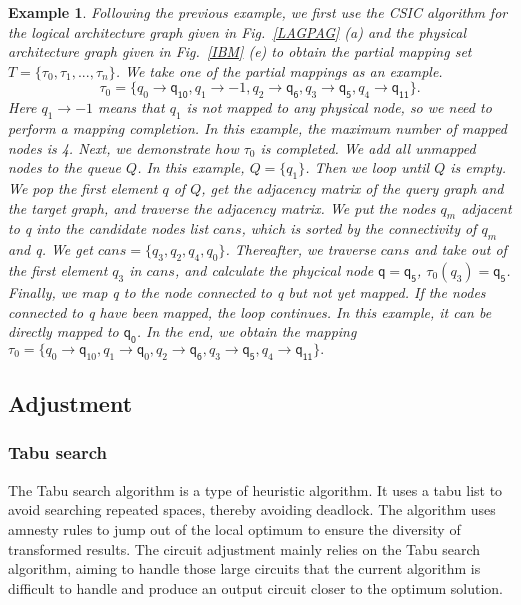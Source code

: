 \documentclass[journal]{IEEEtran}
\newtheorem{example}{Example}[section]
\begin{document}
\begin{example}
	Following the previous example, we first use the CSIC algorithm for the logical architecture graph given in Fig.~\ref{LAGPAG} (a) and the physical architecture graph given in Fig.~\ref{IBM} (e) to obtain the partial mapping set $T=\{\tau_{0},\tau_{1},...,\tau_{n}\}$. We take one of the partial mappings as an example.
	$$\tau_{0}=\{\textit{q}_\textit{0}\rightarrow \textsf{q}_{\textsf{10}},\textit{q}_\textit{1}\rightarrow -1,
	\textit{q}_\textit{2}\rightarrow \textsf{q}_{\textsf{6}},\textit{q}_\textit{3}\rightarrow \textsf{q}_{\textsf{5}},\textit{q}_\textit{4}\rightarrow \textsf{q}_{\textsf{11}}\}. $$ 
Here $\textit{q}_\textit{1}\rightarrow -1$ means that $\textit{q}_\textit{1}$ is not mapped to any physical node, so we need to perform a mapping completion. In this example, the maximum number of mapped nodes is 4. Next, we demonstrate how $\tau_{0}$ is completed. We add all unmapped nodes to the queue $Q$. In this example, $Q=\{\textit{q}_\textit{1}\}$. Then we loop until $Q$ is empty. We pop the first element $q$ of $Q$, get the adjacency matrix of the query graph and the target graph, and traverse the adjacency matrix. We put the nodes  $\textit{q}_\textit{m}$ adjacent to \textit{q} into the candidate nodes list $cans$, which is sorted by the connectivity of $\textit{q}_\textit{m}$ and \textit{q}. We get $cans=\{\textit{q}_\textit{3},\textit{q}_\textit{2},\textit{q}_\textit{4},\textit{q}_\textit{0}\}$. Thereafter, we traverse $cans$ and take out of the first element $\textit{q}_\textit{3}$ in $cans$, and calculate the phycical node $\textsf{q}=\textsf{q}_{\textsf{5}}$, $\tau_0(\textit{q}_\textit{3})=\textsf{q}_{\textsf{5}}$. Finally, we map \textit{q} to the node connected to \textsf{q} but not yet mapped. If the nodes connected to \textsf{q} have been mapped, the loop continues. In this example, it can be directly mapped to $\textsf{q}_{\textsf{0}}$. In the end, we obtain the mapping $ \tau_{0}=\{\textit{q}_\textit{0}\rightarrow  \textsf{q}_{10},\textit{q}_\textit{1}\rightarrow \textsf{q}_{0},	\textit{q}_\textit{2}\rightarrow  \textsf{q}_{\textsf{6}},\textit{q}_\textit{3}\rightarrow  \textsf{q}_{\textsf{5}},\textit{q}_\textit{4}\rightarrow  \textsf{q}_{\textsf{11}}\}. $
	\end{example}
\subsection{Adjustment}
\subsubsection{Tabu search}
The Tabu search algorithm is a type of heuristic algorithm. It uses a tabu list to avoid searching repeated spaces, thereby avoiding deadlock. The algorithm uses amnesty rules to jump out of the local optimum to ensure the diversity of transformed results. The circuit adjustment mainly relies on the Tabu search algorithm, aiming to handle those large circuits that the current algorithm is difficult to handle and produce an output circuit closer to the optimum solution.
\end{document}
